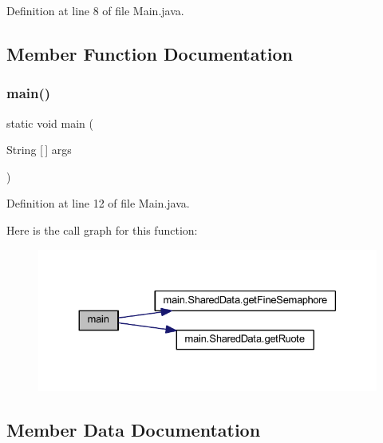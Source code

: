 Definition at line 8 of file Main.\+java.



\subsection{Member Function Documentation}
\mbox{\label{classmain_1_1_main_a8b260eecbaabcef8473fd87ada040682}} 
\subsubsection{\texorpdfstring{main()}{main()}}
{\footnotesize\ttfamily static void main (\begin{DoxyParamCaption}\item[{String \mbox{[}$\,$\mbox{]}}]{args }\end{DoxyParamCaption})\hspace{0.3cm}{\ttfamily [static]}}



Definition at line 12 of file Main.\+java.

Here is the call graph for this function\+:
\nopagebreak
\begin{figure}[H]
\begin{center}
\leavevmode
\includegraphics[width=330pt]{classmain_1_1_main_a8b260eecbaabcef8473fd87ada040682_cgraph}
\end{center}
\end{figure}


\subsection{Member Data Documentation}
\mbox{\label{classmain_1_1_main_ad2b26d92ead66c3a1c4e4d4d77394aba}} 
